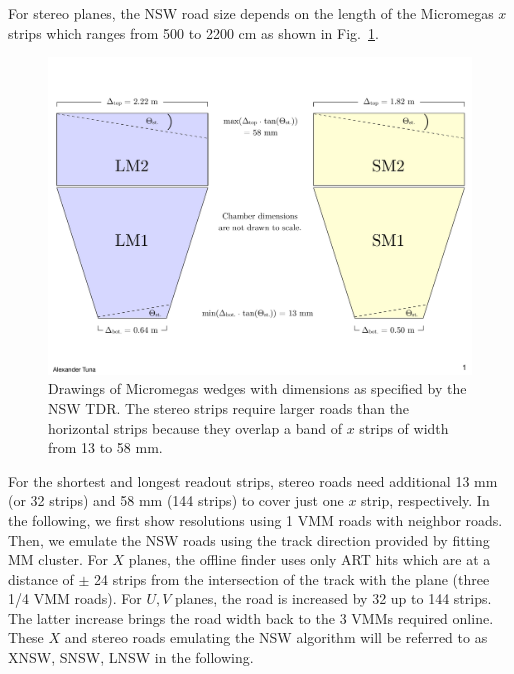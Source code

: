  For stereo planes, the NSW road size depends on the length of the Micromegas $x$ strips which ranges from 500 to 2200 cm as shown in
 Fig.~\ref{fig:stereo_roads}.
 \begin{figure}[!htpb]
  \begin{center}
    \includegraphics[width=1.0\textwidth]{figures/cartoons/stereo_roads.pdf}
  \end{center}
  \vspace{-10pt}
  \caption{Drawings of  Micromegas wedges with  dimensions as specified by the NSW TDR. The stereo strips require larger roads than the horizontal strips because they 
overlap a band of $x$ strips of width from  13 to 58 mm.}
  \label{fig:stereo_roads}
\end{figure}
For the shortest and longest readout strips, stereo roads need  additional 13 mm (or 32 strips) and 58 mm (144 strips) to cover just one $x$ strip, respectively.
In the following, we first show resolutions using 1 VMM roads with neighbor roads. Then, we emulate the NSW roads using the 
track direction provided by fitting MM cluster.
For $X$ planes, the offline finder uses only ART hits which are at a distance of $\pm$ 24 strips from the intersection of the track with the plane (three 1/4 VMM roads).
For $U,V$ planes, the road is increased by 32 up to 144 strips. The latter increase brings the road width back to the 3 VMMs required online.  
These $X$ and stereo roads emulating the NSW algorithm will be referred to as XNSW, SNSW,  LNSW in the following.
%

